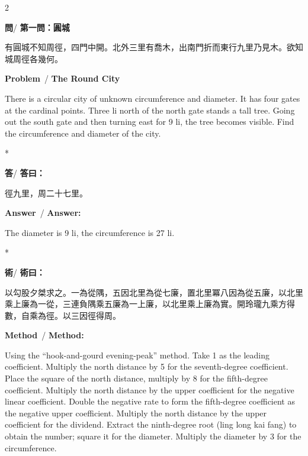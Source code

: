 \documentclass[11pt,a4paper]{article}
\newcommand{\wen}{\textbf{\color{sectioncolor}問}}
\newcommand{\da}{\textbf{\color{answercolor}答}}
\newcommand{\shu}{\textbf{\color{methodcolor}術}}
\newcommand{\prb}{\textbf{\color{sectioncolor}Problem}}
\newcommand{\ans}{\textbf{\color{answercolor}Answer}}
\newcommand{\meth}{\textbf{\color{methodcolor}Method}}
\begin{document}
\begin{paracol}{2}

\begin{leftcolumn*}
\wen / \textbf{第一問：圓城}

有圓城不知周徑，四門中開。北外三里有喬木，出南門折而東行九里乃見木。欲知城周徑各幾何。
\end{leftcolumn*}

\begin{rightcolumn}
\prb\ / \textbf{The Round City}

There is a circular city of unknown circumference 
and diameter. It has four gates at the cardinal points. Three li north 
of the north gate stands a tall tree. Going out the south gate and then 
turning east for 9 li, the tree becomes visible. Find the circumference 
and diameter of the city.
\end{rightcolumn}

\switchcolumn[0]*

\begin{leftcolumn*}
\da / \textbf{答曰：}

徑九里，周二十七里。
\end{leftcolumn*}

\begin{rightcolumn}
\ans\ / \textbf{Answer:}

The diameter is 9 li, the circumference is 27 li.
\end{rightcolumn}

\switchcolumn[0]*

\begin{leftcolumn*}
\shu / \textbf{術曰：}

以勾股夕桀求之。一為從隅，五因北里為從七廉，置北里冪八因為從五廉，以北里乘上廉為一從，三連負隅乘五廉為一上廉，以北里乘上廉為實。開玲瓏九乘方得數，自乘為徑。以三因徑得周。
\end{leftcolumn*}

\begin{rightcolumn}
\meth\ / \textbf{Method:}

Using the ``hook-and-gourd evening-peak'' method. Take 1 
as the leading coefficient. Multiply the north distance by 5 for the 
seventh-degree coefficient. Place the square of the north distance, 
multiply by 8 for the fifth-degree coefficient. Multiply the north 
distance by the upper coefficient for the negative linear coefficient. 
Double the negative rate to form the fifth-degree coefficient as the 
negative upper coefficient. Multiply the north distance by the upper 
coefficient for the dividend. Extract the ninth-degree root (ling long kai fang) 
to obtain the number; square it for the diameter. Multiply the diameter 
by 3 for the circumference.
\end{rightcolumn}

\end{paracol}
\end{document}
